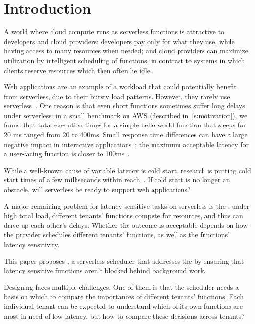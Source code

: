 \section{Introduction}
\label{s:intro}

A world where cloud compute runs as serverless functions is attractive to
developers and cloud providers: developers pay only for what they use, while having
access to many resources when needed; and cloud providers can maximize
utilization by intelligent scheduling of functions, in contrast to systems in
which clients reserve resources which then often lie idle.

Web applications are an example of a workload that could potentially benefit
from serverless, due to their bursty load patterns. However, they rarely use
serverless~\cite{reddit-serverless1, reddit-serverless2, not-lambda-blog}. One
reason is that even short functions sometimes suffer long delays under
serverless: in a small benchmark on AWS (described in~\autoref{s:motivation}),
we found that total execution times for a simple hello world function that
sleeps for 20 ms ranged from 20 to 400ms. Small response time differences can
have a large negative impact in interactive
applications~\cite{amz-page-load,google-page-load}; the maximum acceptable
latency for a user-facing function is closer to 100ms~\cite{page-load-time}.

While a well-known cause of variable latency is cold start, research is putting
cold start times of a few milliseconds within reach~\cite{sigmaos,mitosis}. If
cold start is no longer an obstacle, will serverless be ready to support web
applications?

A major remaining problem for latency-sensitive tasks on serverless is the
\emph{\problem{}}: under high total load, different tenants' functions compete
for resources, and thus can drive up each other's delays. Whether the outcome is
acceptable depends on how the provider schedules different tenants' functions,
as well as the functions' latency sensitivity.

This paper proposes \sys{}, a serverless scheduler that addresses the \problem{}
by ensuring that latency sensitive functions aren't blocked behind background
work.

Designing \sys{} faces multiple challenges. One of them is that the scheduler
needs a basis on which to compare the importances of different tenants'
functions. Each individual tenant can be expected to understand which of its own
functions are most in need of low latency, but how to compare these decisions
across tenants?

